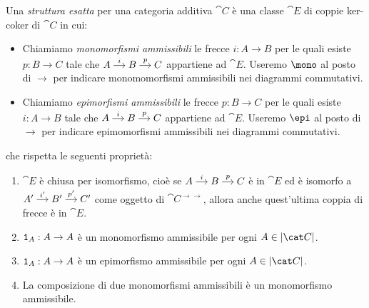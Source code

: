 \begin{definition}\label{definition:CategorieEsatte}
  Una {\em struttura esatta} per una categoria additiva \(\cat C\) è una
  classe \(\cat E\) di coppie ker-coker di \(\cat C\) in cui:
  \begin{itemize}[leftmargin=*]
  \item Chiamiamo {\em monomorfismi ammissibili} le frecce
    \(i : A \to B\) per le quali esiste \(p : B \to C\) tale che
    \(\begin{tikzcd}[column sep=small, cramped] A \ar["{i}", r] & B
      \ar["{p}", r] & C \end{tikzcd}\) appartiene ad \(\cat E\). Useremo
    \(\mono\) al posto di \(\to\) per indicare monomomorfismi ammissibili
    nei diagrammi commutativi.
  \item Chiamiamo {\em epimorfismi ammissibili} le frecce
    \(p : B \to C\) per le quali esiste \(i : A \to B\) tale che
    \(\begin{tikzcd}[column sep=small, cramped] A \ar["{i}", r] & B
      \ar["{p}", r] & C \end{tikzcd}\) appartiene ad \(\cat E\). Useremo
    \(\epi\) al posto di \(\to\) per indicare epimomorfismi ammissibili
    nei diagrammi commutativi.
  \end{itemize}
  che rispetta le seguenti proprietà:
  \begin{enumerate}[leftmargin=*, label=(E\arabic*),
    ref=(E\arabic*)]
  \item \(\cat E\) è chiusa per isomorfismo, cioè se
    \(\begin{tikzcd}[column sep=small, cramped] A \ar["{i}", r] & B
      \ar["{p}", r] & C \end{tikzcd}\) è in \(\cat E\) ed è isomorfo a
    \(\begin{tikzcd}[column sep=small, cramped] A' \ar["{i'}", r] & B'
      \ar["{p'}", r] & C' \end{tikzcd}\) come oggetto di
    \(\cat C^{\to\to}\), allora anche quest'ultima coppia di frecce è in
    \(\cat E\).
  \item \label{item:EO} \(\mathtt 1_A : A \to A\) è un monomorfismo ammissibile
    per ogni \(A \in \obj{\cat C}\).
  \item \label{item:EOop} \(\mathtt 1_A : A \to A\) è un epimorfismo ammissibile
    per ogni \(A \in \obj{\cat C}\).
  \item \label{item:E1} La composizione di due monomorfismi ammissibili
    è un monomorfismo ammissibile.

\end{enumerate}
\end{definition}
